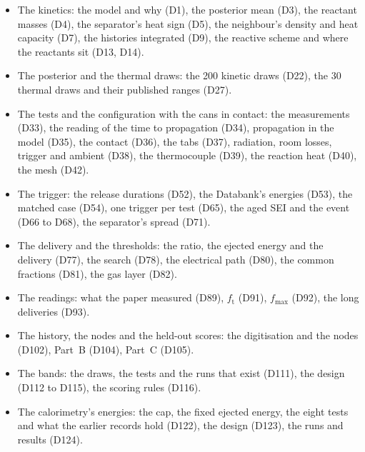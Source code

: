 \documentclass[preprint,12pt]{elsarticle}
\newcommand{\ft}{f_{\mathrm{t}}}
\newcommand{\fmax}{f_{\mathrm{max}}}
\begin{document}
\begin{itemize}
\item The kinetics: the model and why (D1), the posterior mean (D3), the reactant masses (D4), the separator's heat sign (D5), the neighbour's density and heat capacity (D7), the histories integrated (D9), the reactive scheme and where the reactants sit (D13, D14).
\item The posterior and the thermal draws: the 200 kinetic draws (D22), the 30 thermal draws and their published ranges (D27).
\item The tests and the configuration with the cans in contact: the measurements (D33), the reading of the time to propagation (D34), propagation in the model (D35), the contact (D36), the tabs (D37), radiation, room losses, trigger and ambient (D38), the thermocouple (D39), the reaction heat (D40), the mesh (D42).
\item The trigger: the release durations (D52), the Databank's energies (D53), the matched case (D54), one trigger per test (D65), the aged SEI and the event (D66 to D68), the separator's spread (D71).
\item The delivery and the thresholds: the ratio, the ejected energy and the delivery (D77), the search (D78), the electrical path (D80), the common fractions (D81), the gas layer (D82).
\item The readings: what the paper measured (D89), $\ft$ (D91), $\fmax$ (D92), the long deliveries (D93).
\item The history, the nodes and the held-out scores: the digitisation and the nodes (D102), Part~B (D104), Part~C (D105).
\item The bands: the draws, the tests and the runs that exist (D111), the design (D112 to D115), the scoring rules (D116).
\item The calorimetry's energies: the cap, the fixed ejected energy, the eight tests and what the earlier records hold (D122), the design (D123), the runs and results (D124).
\end{itemize}



\end{document}
